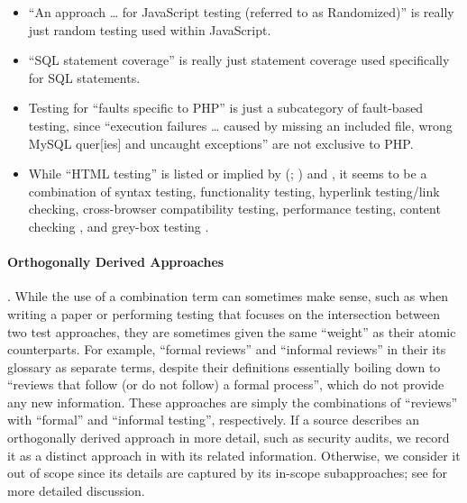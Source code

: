     \begin{itemize}
        \item ``An approach \dots{} for JavaScript testing
              (referred to as Randomized)'' \citep[p.~192]{DoğanEtAl2014} is
              really just random testing used within JavaScript.
        \item ``SQL statement coverage'' \citep[Tab.~13]{DoğanEtAl2014}%
               is really just statement coverage
              used specifically for SQL statements.
        \item Testing for ``faults specific to PHP'' is just a subcategory of
              fault-based testing, since ``execution failures \dots{} caused by
              missing an included file, wrong MySQL quer[ies] and uncaught
              exceptions'' \citep[Tab.~27]{DoğanEtAl2014}
              are not exclusive to PHP.
        \item While ``HTML testing'' is listed or implied by
              \citeauthor{Gerrard2000a} (\citeyear[Tab.~2]{Gerrard2000a};
              \citeyear[Tab.~1, p.~3]{Gerrard2000b}) and
              \citet[p.~220]{Patton2006}, it seems to be a combination of syntax
              testing, functionality testing, hyperlink testing/link checking,
              cross-browser compatibility testing, performance testing,
              content checking \citep[p.~3]{Gerrard2000b}, and grey-box testing
              \citep[pp.~218\==220]{Patton2006}.
    \end{itemize}

    \paragraph{Orthogonally Derived Approaches}\label{orth-test}
\orthTestIntro. While the use of a combination term can sometimes
    make sense, such as when writing a paper or performing testing that focuses
    on the intersection between two test approaches, they are sometimes given
    the same ``weight'' as their atomic counterparts. For example, \citetISTQB{}
     ``formal reviews'' and ``informal reviews'' in
    \ifnotpaper their \else its \fi glossary as separate terms, despite their
    definitions essentially boiling down to ``reviews that follow (or do not
    follow) a formal process'', which do not provide any new information.
    These approaches are simply the combinations of ``reviews'' with ``formal''
    and ``informal testing'', respectively. If a source describes an orthogonally
    derived approach in more detail, such as security audits, we record it as a
    distinct approach in \ourApproachGlossary{} with its related information.
    Otherwise, we consider it out of scope since its details are captured by its
    in-scope subapproaches; see  for more detailed discussion.
\fi

